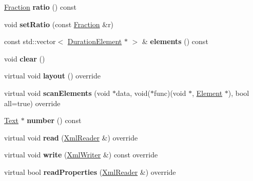 \begin{DoxyCompactItemize}
\hyperlink{class_ms_1_1_fraction}{Fraction} {\bfseries ratio} () const
\item 
\mbox{\label{class_ms_1_1_tuplet_afe2203c33521ceb7dfb756e21dceac2b}} 
void {\bfseries set\+Ratio} (const \hyperlink{class_ms_1_1_fraction}{Fraction} \&r)
\item 
\mbox{\label{class_ms_1_1_tuplet_a335f84666bd36e2bca5963785ae9759a}} 
const std\+::vector$<$ \hyperlink{class_ms_1_1_duration_element}{Duration\+Element} $\ast$ $>$ \& {\bfseries elements} () const
\item 
\mbox{\label{class_ms_1_1_tuplet_a035b1fae68032e513d73c2411c8f8fb4}} 
void {\bfseries clear} ()
\item 
\mbox{\label{class_ms_1_1_tuplet_a4926540c91f806d69f5b56be91301c7c}} 
virtual void {\bfseries layout} () override
\item 
\mbox{\label{class_ms_1_1_tuplet_aad4e6508272eb96ff88654e3f26d8687}} 
virtual void {\bfseries scan\+Elements} (void $\ast$data, void($\ast$func)(void $\ast$, \hyperlink{class_ms_1_1_element}{Element} $\ast$), bool all=true) override
\item 
\mbox{\label{class_ms_1_1_tuplet_a6a54d737a316219ca42306e6c319a43a}} 
\hyperlink{class_ms_1_1_text}{Text} $\ast$ {\bfseries number} () const
\item 
\mbox{\label{class_ms_1_1_tuplet_a360ed0fcc44924c02b1179ed41a65ef3}} 
virtual void {\bfseries read} (\hyperlink{class_ms_1_1_xml_reader}{Xml\+Reader} \&) override
\item 
\mbox{\label{class_ms_1_1_tuplet_a45b8ab23ee3cfccd0b5ac9b079947d13}} 
virtual void {\bfseries write} (\hyperlink{class_ms_1_1_xml_writer}{Xml\+Writer} \&) const override
\item 
\mbox{\label{class_ms_1_1_tuplet_ab98b5711c810e135fa3083f45bd34ca6}} 
virtual bool {\bfseries read\+Properties} (\hyperlink{class_ms_1_1_xml_reader}{Xml\+Reader} \&) override
\item 
\mbox{\label{class_ms_1_1_tuplet_a71c79886c2160329c1cf741fde30f8f2}} 

\end{DoxyCompactItemize}
